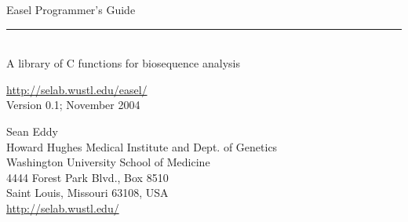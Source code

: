 \begin{titlepage}
{\Large

\vspace*{\fill}

\noindent
{\Huge{Easel Programmer's Guide}} \\ 
\rule[2pt]{\textwidth}{1pt} \\
\hspace*{\fill} {\large {A library of C functions for
    biosequence analysis} \\ }

\vspace*{\fill}

\begin{center}
\url{http://selab.wustl.edu/easel/}\\
Version 0.1; November 2004 \\ 

\vspace*{\fill}

Sean Eddy\\
Howard Hughes Medical Institute and Dept. of Genetics\\
Washington University School of Medicine\\
4444 Forest Park Blvd., Box 8510\\
Saint Louis, Missouri 63108, USA\\
\url{http://selab.wustl.edu/}\\
\end{center}

\vspace*{\fill}
}
\end{titlepage}

